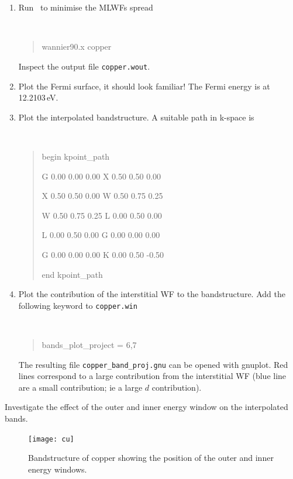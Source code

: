 \documentclass[a4paper,11pt,twoside]{article}
\begin{document}
\begin{enumerate}
\item Run \wannier\ to minimise the MLWFs spread
{\tt
\begin{quote}
wannier90.x copper
\end{quote} }
Inspect the output file {\tt copper.wout}. 

\item Plot the Fermi surface, it should look familiar! The Fermi
  energy is at 12.2103\,eV. 

\item Plot the interpolated bandstructure. A suitable path in k-space is
\smallskip
{\tt
\begin{quote}
begin kpoint\_path

G 0.00  0.00  0.00    X 0.50  0.50  0.00

X 0.50  0.50  0.00    W 0.50  0.75  0.25

W 0.50  0.75  0.25    L 0.00  0.50  0.00

L 0.00  0.50  0.00    G 0.00  0.00  0.00

G 0.00  0.00  0.00    K 0.00  0.50 -0.50
 
end kpoint\_path
\end{quote} }
\item Plot the contribution of the interstitial WF to the
  bandstructure. Add the following keyword to {\tt copper.win}
\smallskip
{\tt
\begin{quote}
bands\_plot\_project = 6,7
\end{quote} } The resulting file {\tt copper\_band\_proj.gnu} can be
opened with gnuplot. Red lines correspond to a large contribution from
the interstitial WF (blue line are a small contribution; ie a large
$d$ contribution).


\end{enumerate}




Investigate the effect of the outer and inner energy window on the
interpolated bands. 



\begin{figure}[h]
\begin{center}
\texttt{[image: cu]}
\caption{Bandstructure of copper showing the position of the outer
  and inner energy windows.} 
\label{fig:cu-bnd}
\end{center}
\end{figure}

\clearpage

\label{sec:using pwscf}
\end{document}
